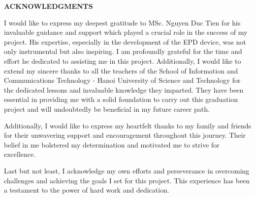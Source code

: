 \documentclass[../Main.tex]{subfiles}
\begin{document}
\begin{center}
    \Large{\textbf{ACKNOWLEDGMENTS}}\\
\end{center}
\vspace{1cm}

I would like to express my deepest gratitude to MSc. Nguyen Duc Tien for his invaluable guidance and support which played a crucial role in the success of my project. His expertise, especially in the development of the EPD device, was not only instrumental but also inspiring. I am profoundly grateful for the time and effort he dedicated to assisting me in this project. Additionally, I would like to extend my sincere thanks to all the teachers of the School of Information and Communications Technology - Hanoi University of Science and Technology for the dedicated lessons and invaluable knowledge they imparted. They have been essential in providing me with a solid foundation to carry out this graduation project and will undoubtedly be beneficial in my future career path.

Additionally, I would like to express my heartfelt thanks to my family and friends for their unwavering support and encouragement throughout this journey. Their belief in me bolstered my determination and motivated me to strive for excellence.

Last but not least, I acknowledge my own efforts and perseverance in overcoming challenges and achieving the goals I set for this project. This experience has been a testament to the power of hard work and dedication.
\end{document}

